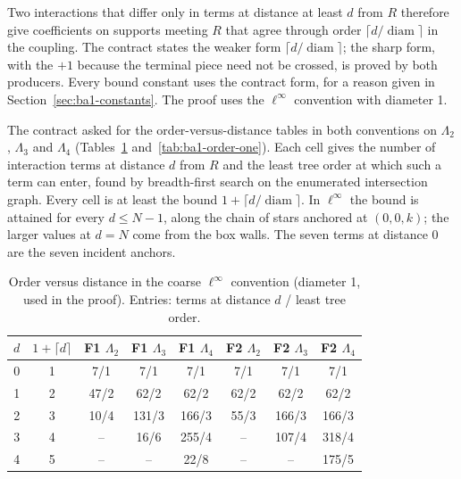 Two interactions that differ only in terms at distance at least $d$ from $R$
therefore give coefficients on supports meeting $R$ that agree through order
$\lceil d/\operatorname{diam}\rceil$ in the coupling. The contract states the
weaker form $\lceil d/\operatorname{diam}\rceil$; the sharp form, with the
$+1$ because the terminal piece need not be crossed, is proved by both
producers. Every bound constant uses the contract form, for a reason given in
Section~\ref{sec:ba1-constants}. The proof uses the $\ell^\infty$
convention with diameter 1.

The contract asked for the order-versus-distance tables in both conventions
on $\Lambda_2$, $\Lambda_3$ and $\Lambda_4$ (Tables~\ref{tab:ba1-order-inf}
and~\ref{tab:ba1-order-one}). Each cell gives the number of interaction terms
at distance $d$ from $R$ and the least tree order at which such a term can
enter, found by breadth-first search on the enumerated intersection graph.
Every cell is at least the bound $1+\lceil d/\operatorname{diam}\rceil$. In
$\ell^\infty$ the bound is attained for every $d\le N-1$, along the chain of
stars anchored at $(0,0,k)$; the larger values at $d=N$ come from the box
walls. The seven terms at distance 0 are the seven incident anchors.

\begin{table}[htbp]
\centering\small
\caption{Order versus distance in the coarse $\ell^\infty$ convention
(diameter 1, used in the proof). Entries: terms at distance $d$ / least tree
order.}
\label{tab:ba1-order-inf}
\begin{tabular}{rc cccccc}
\toprule
$d$ & $1+\lceil d\rceil$ & F1 $\Lambda_2$ & F1 $\Lambda_3$ & F1 $\Lambda_4$ & F2 $\Lambda_2$ & F2 $\Lambda_3$ & F2 $\Lambda_4$\\
\midrule
0 & 1 & 7/1 & 7/1 & 7/1 & 7/1 & 7/1 & 7/1\\
1 & 2 & 47/2 & 62/2 & 62/2 & 62/2 & 62/2 & 62/2\\
2 & 3 & 10/4 & 131/3 & 166/3 & 55/3 & 166/3 & 166/3\\
3 & 4 & -- & 16/6 & 255/4 & -- & 107/4 & 318/4\\
4 & 5 & -- & -- & 22/8 & -- & -- & 175/5\\
\bottomrule
\end{tabular}
\end{table}

